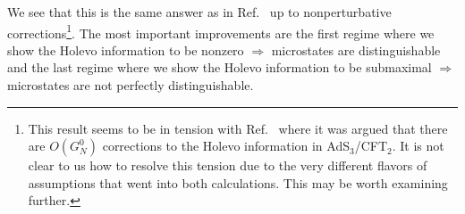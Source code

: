 \documentclass[a4paper,11pt]{article}
\begin{document}
We see that this is the same answer as in Ref.~\cite{2017PhRvD..96f6017B} up to nonperturbative corrections\footnote{This result seems to be in tension with Ref.~\cite{2018PhRvL.121y1603G} where it was argued that there are $O(G_N^0)$ corrections to the Holevo information in AdS$_3$/CFT$_2$. It is not clear to us how to resolve this tension due to the very different flavors of assumptions that went into both calculations. This may be worth examining further.}. The most important improvements are the first regime where we show the Holevo information to be nonzero $\Rightarrow$ microstates are distinguishable and the last regime where we show the Holevo information to be submaximal $\Rightarrow$ microstates are not perfectly distinguishable.



% 
% 
\end{document}
